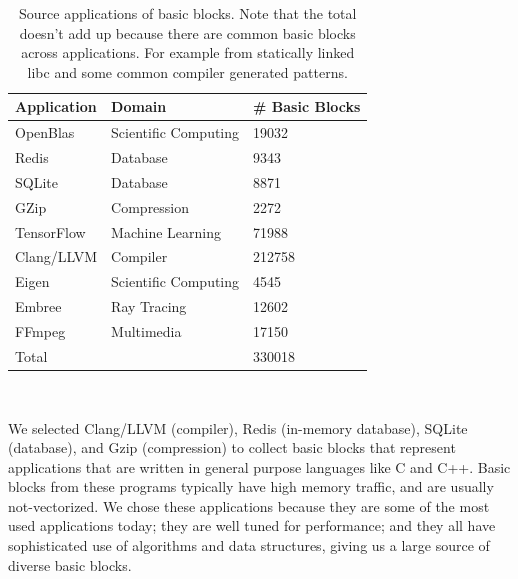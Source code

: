 \begin{table}
\begin{tabular}{|p{}|p{}|p{}|}
\hline
\textbf{Application} & \textbf{Domain} & \textbf{\# Basic Blocks} \\

\hline
OpenBlas & Scientific Computing & 19032 \\

\hline
Redis & Database & 9343  \\

\hline
SQLite & Database & 8871 \\

\hline
GZip & Compression & 2272 \\

\hline
TensorFlow & Machine Learning & 71988 \\

\hline 
Clang/LLVM & Compiler & 212758 \\

\hline
Eigen & Scientific Computing & 4545 \\

\hline
Embree & Ray Tracing & 12602 \\

\hline
FFmpeg & Multimedia & 17150 \\

\hline
\multicolumn{2}{|l|}{Total}  & 330018\\


\hline
\end{tabular}
\\
\caption{Source applications of basic blocks. Note that the total doesn't add up because there are common basic blocks across applications. For example from statically linked libc and some common compiler generated patterns.}
\label{tab:apps}
\end{table}

We selected Clang/LLVM\cite{llvm} (compiler),
Redis (in-memory database), SQLite (database), and Gzip (compression)
to collect basic blocks that represent
applications that are written in general purpose languages
like C and C++.
Basic blocks from these programs
typically have high memory traffic, and are usually not-vectorized.
We chose these applications because they are some of the most used
applications today; they are well tuned for performance;
and they all have sophisticated use of algorithms and data structures,
giving us a large source of diverse basic blocks.

